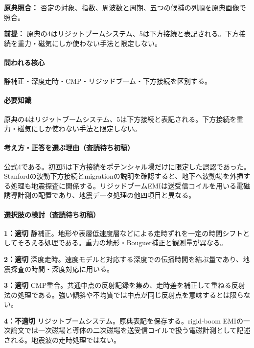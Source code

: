 \noindent\textbf{原典照合：} 否定の対象、指数、周波数と周期、五つの候補の列順を原典画像で照合。\par

\noindent\textbf{前提：} 原典の4はリジットブームシステム、5は下方接続と表記される。下方接続を重力・磁気にしか使わない手法と限定しない。\par

\paragraph{問われる核心} 静補正・深度走時・CMP・リジッドブーム・下方接続を区別する。

\paragraph{必要知識} 原典の4はリジットブームシステム、5は下方接続と表記される。下方接続を重力・磁気にしか使わない手法と限定しない。

\paragraph{考え方・正答を選ぶ理由（査読待ち初稿）} 公式4である。初回5は下方接続をポテンシャル場だけに限定した誤認であった。Stanfordの波動下方接続とmigrationの説明を確認すると、地下へ波動場を外挿する処理も地震探査に関係する。リジッドブームEMIは送受信コイルを用いる電磁誘導計測の配置であり、地震データ処理の他四項目と異なる。

\paragraph{選択肢の検討（査読待ち初稿）}\mbox{}\par

\noindent\textbf{1：適切} 静補正。地形や表層低速度層などによる走時ずれを一定の時間シフトとしてそろえる処理である。重力の地形・Bouguer補正と観測量が異なる。\par

\noindent\textbf{2：適切} 深度走時。速度モデルと対応する深度での伝播時間を結ぶ量であり、地震探査の時間・深度対応に用いる。\par

\noindent\textbf{3：適切} CMP重合。共通中点の反射記録を集め、走時差を補正して重ねる反射法の処理である。強い傾斜や不均質では中点が同じ反射点を意味するとは限らない。\par

\noindent\textbf{4：不適切} リジットブームシステム。原典表記を保存する。rigid-boom EMIの一次論文では一次磁場と導体の二次磁場を送受信コイルで扱う電磁計測として記述される。地震波の走時処理ではない。\par

